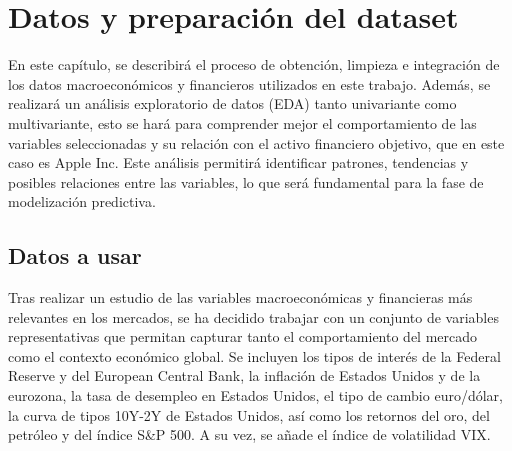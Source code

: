 \chapter{Datos y preparación del dataset}
\label{ch:EDA}
En este capítulo, se describirá el proceso de obtención, limpieza e integración de los datos macroeconómicos y financieros utilizados en este trabajo. Además, se realizará un análisis exploratorio de datos (EDA) tanto univariante como multivariante, esto se hará para comprender mejor el comportamiento de las variables seleccionadas y su relación con el activo financiero objetivo, que en este caso es Apple Inc. Este análisis permitirá identificar patrones, tendencias y posibles relaciones entre las variables, lo que será fundamental para la fase de modelización predictiva.

\section{Datos a usar}
Tras realizar un estudio de las variables macroeconómicas y financieras más relevantes en los mercados, se ha decidido trabajar con un conjunto de variables representativas que permitan capturar tanto el comportamiento del mercado como el contexto económico global. Se incluyen los tipos de interés de la Federal Reserve y del European Central Bank, la inflación de Estados Unidos y de la eurozona, la tasa de desempleo en Estados Unidos, el tipo de cambio euro/dólar, la curva de tipos 10Y-2Y de Estados Unidos, así como los retornos del oro, del petróleo y del índice S\&P 500. A su vez, se añade el índice de volatilidad VIX.

